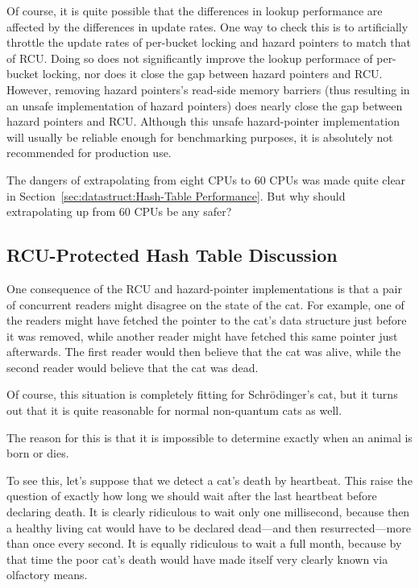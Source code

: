 Of course, it is quite possible that the differences in lookup performance
are affected by the differences in update rates.
One way to check this is to artificially throttle the update rates of
per-bucket locking and hazard pointers to match that of RCU.
Doing so does not significantly improve the lookup performace of
per-bucket locking, nor does it close the gap between hazard pointers
and RCU.
However, removing hazard pointers's read-side memory barriers
(thus resulting in an unsafe implementation of hazard pointers)
does nearly close the gap between hazard pointers and RCU.
Although this unsafe hazard-pointer implementation will
usually be reliable enough for benchmarking purposes, it is absolutely
not recommended for production use.

\QuickQuiz{}
	The dangers of extrapolating from eight CPUs to 60 CPUs was
	made quite clear in
	Section~\ref{sec:datastruct:Hash-Table Performance}.
	But why should extrapolating up from 60 CPUs be any safer?
 \QuickQuizEnd

\subsection{RCU-Protected Hash Table Discussion}
\label{sec:datastruct:RCU-Protected Hash Table Discussion}

One consequence of the RCU and hazard-pointer implementations is
that a pair of concurrent readers might disagree on the state of
the cat.
For example, one of the readers might have fetched the pointer to
the cat's data structure just before it was removed, while another
reader might have fetched this same pointer just afterwards.
The first reader would then believe that the cat was alive, while
the second reader would believe that the cat was dead.

Of course, this situation is completely fitting for Schr\"odinger's
cat, but it turns out that it is quite reasonable for normal
non-quantum cats as well.

The reason for this is that it is impossible to determine exactly
when an animal is born or dies.

To see this, let's suppose that we detect a cat's death by heartbeat.
This raise the question of exactly how long we should wait after the
last heartbeat before declaring death.
It is clearly ridiculous to wait only one millisecond, because then
a healthy living cat would have to be declared dead---and then
resurrected---more than once every second.
It is equally ridiculous to wait a full month, because by that time
the poor cat's death would have made itself very clearly known
via olfactory means.


